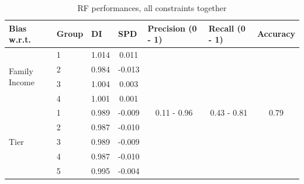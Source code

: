 \documentclass{article}
\begin{document}
\begin{table}[H]
\caption{RF performances, all constraints together}
\begin{tabular}{llcc|ccc}
\hline
\textbf{Bias w.r.t.}                   &  \textbf{Group} & \multicolumn{1}{l}{ \textbf{DI} } & \multicolumn{1}{l}{ \textbf{SPD}}    & \multicolumn{1}{l}{ \textbf{Precision (0 - 1)}} & \multicolumn{1}{l}{\textbf{Recall (0 - 1)}} & \multicolumn{1}{l}{\textbf{Accuracy}} \\
\hline
\multirow{4}{*}{Family Income} & 1     & 1.014                  & 0.011                      & \multirow{13}{*}{0.11 - 0.96}         & \multirow{13}{*}{0.43 - 0.81}      & \multirow{13}{*}{0.79}       \\
                               & 2     & 0.984                  & -0.013                     &                                       &                                    &                              \\
                               & 3     & 1.004                  & 0.003                      &                                       &                                    &                              \\
                               & 4     & 1.001                  & 0.001                      &                                       &                                    &                              \\
\hline
\multirow{5}{*}{Tier}          & 1     & 0.989                  & -0.009                     &                                       &                                    &                              \\
                               & 2     & 0.987                  & -0.010                     &                                       &                                    &                              \\
                               & 3     & 0.989                  & -0.009                     &                                       &                                    &                              \\
                               & 4     & 0.987                  & -0.010                     &                                       &                                    &                              \\
                               & 5     & 0.995                  & -0.004                     &                                       &                                    &                              \\

\end{tabular}
\end{table}
\end{document}
